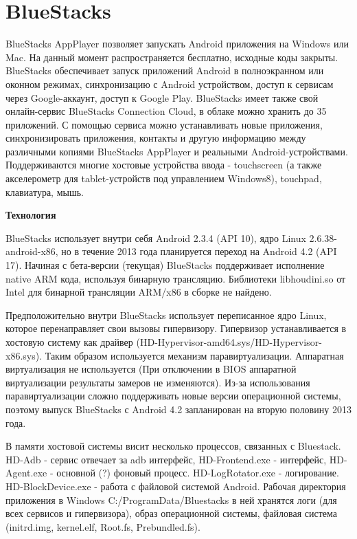 \section{BlueStacks}

BlueStacks AppPlayer позволяет запускать Android приложения на Windows или Mac. На данный момент распространяется бесплатно, исходные коды закрыты. BlueStacks обеспечивает запуск приложений Android в полноэкранном или оконном режимах, синхронизацию с Android устройством, доступ к сервисам через Google-аккаунт, доступ к Google Play. BlueStacks имеет также свой онлайн-сервис BlueStacks Connection Cloud, в облаке можно хранить до 35 приложений. С помощью сервиса можно устанавливать новые приложения, синхронизировать приложения, контакты и другую информацию между различными копиями BlueStacks AppPlayer и реальными Android-устройствами. Поддерживаются многие хостовые устройства ввода - touchscreen (а также акселерометр для tablet-устройств под управлением Windows8), touchpad, клавиатура, мышь.

{\bf Технология}

BlueStacks использует внутри себя Android 2.3.4 (API 10), ядро Linux 2.6.38-android-x86, но в течение 2013 года планируется переход на Android 4.2 (API 17). Начиная с бета-версии (текущая) BlueStacks поддерживает исполнение native ARM кода, используя бинарную трансляцию. Библиотеки libhoudini.so от Intel для бинарной трансляции ARM/x86 в сборке не найдено.

Предположительно внутри BlueStacks использует переписанное ядро Linux, которое перенаправляет свои вызовы гипервизору. Гипервизор устанавливается в хостовую систему как драйвер (HD-Hypervisor-amd64.sys/HD-Hypervisor-x86.sys). Таким образом используется механизм паравиртуализации. Аппаратная виртуализация не используется (При отключении в BIOS аппаратной виртуализации результаты замеров не изменяются). Из-за использования паравиртуализации сложно поддерживать новые версии операционной системы, поэтому выпуск BlueStacks с Android 4.2 запланирован на вторую половину 2013 года.

В памяти хостовой системы висит несколько процессов, связанных с Bluestack. HD-Adb - сервис отвечает за adb интерфейс, HD-Frontend.exe - интерфейс, HD-Agent.exe - основной (?) фоновый процесс. HD-LogRotator.exe - логирование. HD-BlockDevice.exe - работа с файловой системой Android. Рабочая директория приложения в Windows C:/ProgramData/Bluestacks в ней хранятся логи (для всех сервисов и гипервизора), образ операционной системы, файловая система (initrd.img, kernel.elf, Root.fs, Prebundled.fs).

